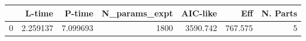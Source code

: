 \begin{tabular}{lrrrrrr}
\toprule
{} &    L-time &    P-time &  N\_params\_expt &  AIC-like &      Eff &  N. Parts \\
\midrule
0 &  2.259137 &  7.099693 &           1800 &  3590.742 &  767.575 &         5 \\
\bottomrule
\end{tabular}
